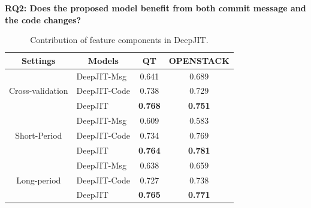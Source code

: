 \hspace{0.5cm}

\noindent \textbf{RQ2: Does the proposed model benefit from both commit message and the code changes?}

\begin{table}[ht!]
  \centering
  \caption{Contribution of feature components in DeepJIT.}
    \begin{tabular}{|c|l|c|c|}
    \hline
    \textbf{Settings} & \multicolumn{1}{c|}{\textbf{Models}} & QT & OPENSTACK \\
    \hline
    \hline
    \multirow{3}[6]{*}{Cross-validation} & DeepJIT-Msg & 0.641 & 0.689 \\
\cline{2-4}          & DeepJIT-Code & 0.738 & 0.729 \\
\cline{2-4}          & DeepJIT & \textbf{0.768} & \textbf{0.751} \\
    \hline
    \multirow{3}[6]{*}{Short-Period} & DeepJIT-Msg & 0.609 & 0.583 \\
\cline{2-4}          & DeepJIT-Code & 0.734 & 0.769 \\
\cline{2-4}          & DeepJIT & \textbf{0.764} & \textbf{0.781} \\
    \hline
    \multirow{3}[6]{*}{Long-period} & DeepJIT-Msg & 0.638 & 0.659 \\
\cline{2-4}          & DeepJIT-Code & 0.727 & 0.738 \\
\cline{2-4}          & DeepJIT & \textbf{0.765} & \textbf{0.771} \\
    \hline
    \end{tabular}%
  \label{tab:variants}%
\end{table}%


